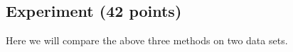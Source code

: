 \begin{enumerate}


\end{enumerate}

 
\subsection{Experiment (42 points)}

Here we will compare the above three methods on two data sets. 

